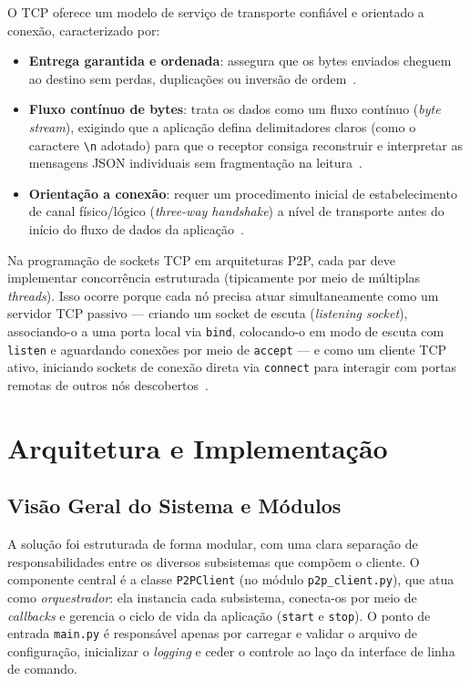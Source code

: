 \documentclass[12pt, a4paper]{article}
\begin{document}
O TCP oferece um modelo de serviço de transporte confiável e orientado a conexão, caracterizado por:
\begin{itemize}
    \item \textbf{Entrega garantida e ordenada}: assegura que os bytes enviados cheguem ao destino sem perdas, duplicações ou inversão de ordem~\cite{kurose}.
    \item \textbf{Fluxo contínuo de bytes}: trata os dados como um fluxo contínuo (\textit{byte stream}), exigindo que a aplicação defina delimitadores claros (como o caractere \verb|\n| adotado) para que o receptor consiga reconstruir e interpretar as mensagens JSON individuais sem fragmentação na leitura~\cite{pyp2p}.
    \item \textbf{Orientação a conexão}: requer um procedimento inicial de estabelecimento de canal físico/lógico (\textit{three-way handshake}) a nível de transporte antes do início do fluxo de dados da aplicação~\cite{kurose}.
\end{itemize}

Na programação de sockets TCP em arquiteturas P2P, cada par deve implementar concorrência estruturada (tipicamente por meio de múltiplas \textit{threads}). Isso ocorre porque cada nó precisa atuar simultaneamente como um servidor TCP passivo — criando um socket de escuta (\textit{listening socket}), associando-o a uma porta local via \texttt{bind}, colocando-o em modo de escuta com \texttt{listen} e aguardando conexões por meio de \texttt{accept} — e como um cliente TCP ativo, iniciando sockets de conexão direta via \texttt{connect} para interagir com portas remotas de outros nós descobertos~\cite{kurose}.


\section{Arquitetura e Implementação}\label{sec:Arq}

\subsection{Visão Geral do Sistema e Módulos}
A solução foi estruturada de forma modular, com uma clara separação de responsabilidades entre os diversos subsistemas que compõem o cliente. O componente central é a classe \texttt{P2PClient} (no módulo \texttt{p2p\_client.py}), que atua como \textit{orquestrador}: ela instancia cada subsistema, conecta-os por meio de \textit{callbacks} e gerencia o ciclo de vida da aplicação (\texttt{start} e \texttt{stop}). O ponto de entrada \texttt{main.py} é responsável apenas por carregar e validar o arquivo de configuração, inicializar o \textit{logging} e ceder o controle ao laço da interface de linha de comando.
\end{document}

